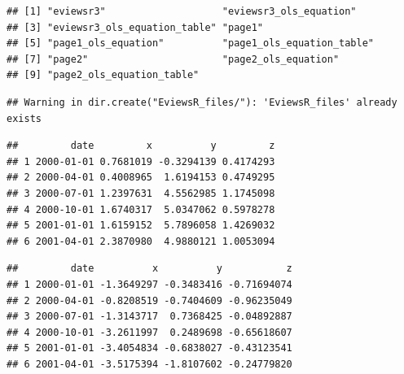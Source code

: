 \documentclass[
]{article}
\newenvironment{Shaded}{\begin{snugshade}}{\end{snugshade}}
\newcommand{\FunctionTok}[1]{\textcolor[rgb]{0.00,0.00,0.00}{#1}}
\newcommand{\NormalTok}[1]{#1}
\newcommand{\SpecialCharTok}[1]{\textcolor[rgb]{0.00,0.00,0.00}{#1}}
\begin{document}
\begin{verbatim}
## [1] "eviewsr3"                    "eviewsr3_ols_equation"      
## [3] "eviewsr3_ols_equation_table" "page1"                      
## [5] "page1_ols_equation"          "page1_ols_equation_table"   
## [7] "page2"                       "page2_ols_equation"         
## [9] "page2_ols_equation_table"
\end{verbatim}

\begin{verbatim}
## Warning in dir.create("EviewsR_files/"): 'EviewsR_files' already exists
\end{verbatim}

\begin{Shaded}
\end{Shaded}

\begin{verbatim}
##         date         x          y         z
## 1 2000-01-01 0.7681019 -0.3294139 0.4174293
## 2 2000-04-01 0.4008965  1.6194153 0.4749295
## 3 2000-07-01 1.2397631  4.5562985 1.1745098
## 4 2000-10-01 1.6740317  5.0347062 0.5978278
## 5 2001-01-01 1.6159152  5.7896058 1.4269032
## 6 2001-04-01 2.3870980  4.9880121 1.0053094
\end{verbatim}

\begin{Shaded}
\end{Shaded}

\begin{verbatim}
##         date          x          y           z
## 1 2000-01-01 -1.3649297 -0.3483416 -0.71694074
## 2 2000-04-01 -0.8208519 -0.7404609 -0.96235049
## 3 2000-07-01 -1.3143717  0.7368425 -0.04892887
## 4 2000-10-01 -3.2611997  0.2489698 -0.65618607
## 5 2001-01-01 -3.4054834 -0.6838027 -0.43123541
## 6 2001-04-01 -3.5175394 -1.8107602 -0.24779820
\end{verbatim}

\begin{Shaded}
\end{Shaded}
\end{document}
